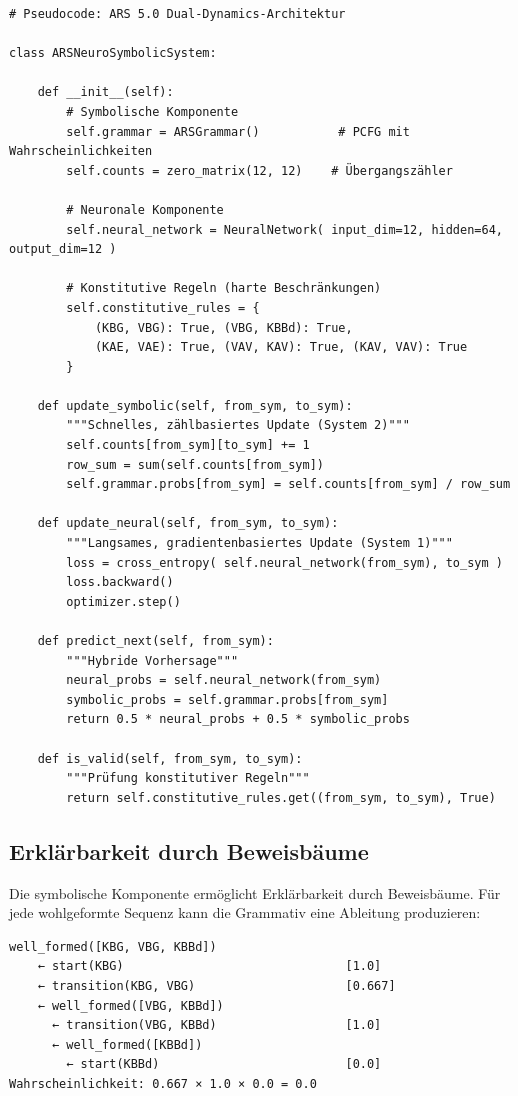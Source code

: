 \documentclass[12pt,a4paper]{article}
\begin{document}
\begin{lstlisting}[caption=Pseudocode für neuro-symbolische ARS]
# Pseudocode: ARS 5.0 Dual-Dynamics-Architektur

class ARSNeuroSymbolicSystem:
    
    def __init__(self):
        # Symbolische Komponente
        self.grammar = ARSGrammar()           # PCFG mit Wahrscheinlichkeiten
        self.counts = zero_matrix(12, 12)    # Übergangszähler
        
        # Neuronale Komponente
        self.neural_network = NeuralNetwork( input_dim=12, hidden=64, output_dim=12 )
        
        # Konstitutive Regeln (harte Beschränkungen)
        self.constitutive_rules = {
            (KBG, VBG): True, (VBG, KBBd): True,
            (KAE, VAE): True, (VAV, KAV): True, (KAV, VAV): True
        }
    
    def update_symbolic(self, from_sym, to_sym):
        """Schnelles, zählbasiertes Update (System 2)"""
        self.counts[from_sym][to_sym] += 1
        row_sum = sum(self.counts[from_sym])
        self.grammar.probs[from_sym] = self.counts[from_sym] / row_sum
    
    def update_neural(self, from_sym, to_sym):
        """Langsames, gradientenbasiertes Update (System 1)"""
        loss = cross_entropy( self.neural_network(from_sym), to_sym )
        loss.backward()
        optimizer.step()
    
    def predict_next(self, from_sym):
        """Hybride Vorhersage"""
        neural_probs = self.neural_network(from_sym)
        symbolic_probs = self.grammar.probs[from_sym]
        return 0.5 * neural_probs + 0.5 * symbolic_probs
    
    def is_valid(self, from_sym, to_sym):
        """Prüfung konstitutiver Regeln"""
        return self.constitutive_rules.get((from_sym, to_sym), True)
\end{lstlisting}

\subsection{Erklärbarkeit durch Beweisbäume}

Die symbolische Komponente ermöglicht Erklärbarkeit durch Beweisbäume.
Für jede wohlgeformte Sequenz kann die Grammativ eine Ableitung produzieren:

\begin{lstlisting}[caption=Beweisbaum für eine wohlgeformte Sequenz]
well_formed([KBG, VBG, KBBd])
    ← start(KBG)                               [1.0]
    ← transition(KBG, VBG)                     [0.667]
    ← well_formed([VBG, KBBd])
      ← transition(VBG, KBBd)                  [1.0]
      ← well_formed([KBBd])
        ← start(KBBd)                          [0.0]
Wahrscheinlichkeit: 0.667 × 1.0 × 0.0 = 0.0
\end{lstlisting}
\end{document}
